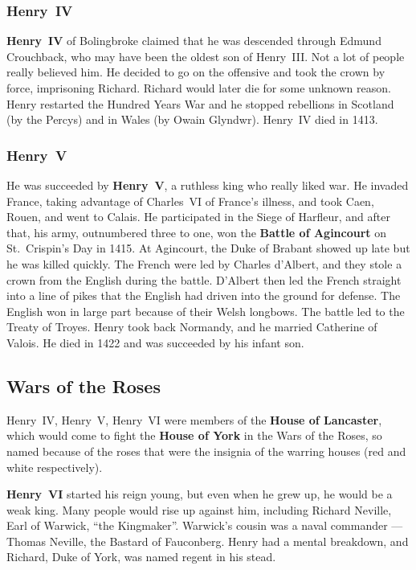 \subsubsection*{Henry~IV}

\textbf{Henry~IV} of Bolingbroke claimed that he was descended through Edmund Crouchback,
who may have been the oldest son of Henry~III\@.
Not a lot of people really believed him.
He decided to go on the offensive and took the crown by force, imprisoning Richard.
Richard would later die for some unknown reason.
Henry restarted the Hundred Years War and he stopped rebellions
in Scotland (by the Percys) and in Wales (by Owain Glyndwr).
Henry~IV died in 1413.

\subsubsection*{Henry~V}

He was succeeded by \textbf{Henry~V}, a ruthless king who really liked war.
He invaded France, taking advantage of Charles~VI of France's illness,
and took Caen, Rouen, and went to Calais.
He participated in the Siege of Harfleur, and after that,
his army, outnumbered three to one,
won the \textbf{Battle of Agincourt} on St.\ Crispin's Day in 1415.
At Agincourt, the Duke of Brabant showed up late but he was killed quickly.
The French were led by Charles d'Albert, and they stole a crown from the English during the battle.
D'Albert then led the French straight into a line of pikes
that the English had driven into the ground for defense.
The English won in large part because of their Welsh longbows.
The battle led to the Treaty of Troyes.
Henry took back Normandy, and he married Catherine of Valois.
He died in 1422 and was succeeded by his infant son.

\subsection*{Wars of the Roses}

Henry~IV, Henry~V, Henry~VI were members of the \textbf{House of Lancaster},
which would come to fight the \textbf{House of York} in the Wars of the Roses,
so named because of the roses
that were the insignia of the warring houses (red and white respectively).

\textbf{Henry~VI} started his reign young, but even when he grew up, he would be a weak king.
Many people would rise up against him,
including Richard Neville, Earl of Warwick, ``the Kingmaker''.
Warwick's cousin was a naval commander --- Thomas Neville, the Bastard of Fauconberg.
Henry had a mental breakdown, and Richard, Duke of York, was named regent in his stead.

